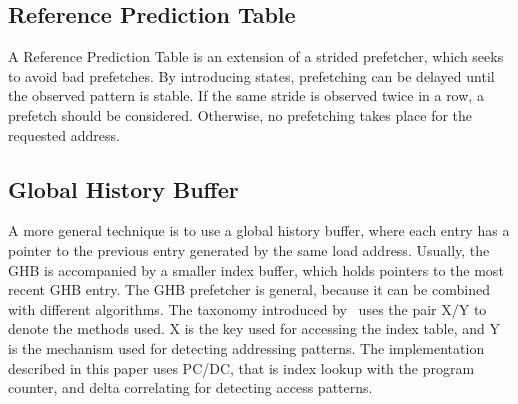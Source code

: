 \subsection{Reference Prediction Table}

A Reference Prediction Table is an extension of a strided prefetcher,
which seeks to avoid bad prefetches. By introducing states,
prefetching can be delayed until the observed pattern is stable. If
the same stride is observed twice in a row, a prefetch should be
considered. Otherwise, no prefetching takes place for the requested
address.

\subsection{Global History Buffer}

A more general technique is to use a global history buffer, where each
entry has a pointer to the previous entry generated by the same load
address. Usually, the GHB is accompanied by a smaller index buffer,
which holds pointers to the most recent GHB entry. The GHB prefetcher
is general, because it can be combined with different algorithms. The
taxonomy introduced by~\cite{nesbit_smith_2005} uses the pair X/Y to
denote the methods used. X is the key used for accessing the index
table, and Y is the mechanism used for detecting addressing
patterns. The implementation described in this paper uses PC/DC, that
is index lookup with the program counter, and delta correlating for
detecting access patterns.
